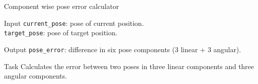\begin{frame}{Component wise pose error calculator}
	\begin{alertblock}{Input}
	\texttt{current\_pose}: pose of current position.\\
	\texttt{target\_pose}: pose of target position.
    \end{alertblock}
    
    \begin{alertblock}{Output}
	\texttt{pose\_error}: difference in six pose components (3 linear + 3 angular).
    \end{alertblock}
    
    \begin{alertblock}{Task}
    Calculates the error between two poses in three linear components and three angular components.
    \end{alertblock}
\end{frame}

